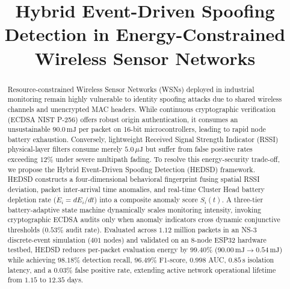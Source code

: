 \documentclass[conference]{IEEEtran}
\begin{document}
\title{Hybrid Event-Driven Spoofing Detection in Energy-Constrained Wireless Sensor Networks}

\author{
}
\maketitle

\begin{abstract}
Resource-constrained Wireless Sensor Networks (WSNs) deployed in industrial monitoring remain highly vulnerable to identity spoofing attacks due to shared wireless channels and unencrypted MAC headers. While continuous cryptographic verification (ECDSA NIST P-256) offers robust origin authentication, it consumes an unsustainable $90.0\,\text{mJ}$ per packet on 16-bit microcontrollers, leading to rapid node battery exhaustion. Conversely, lightweight Received Signal Strength Indicator (RSSI) physical-layer filters consume merely $5.0\,\mu\text{J}$ but suffer from false positive rates exceeding $12\%$ under severe multipath fading. To resolve this energy-security trade-off, we propose the Hybrid Event-Driven Spoofing Detection (HEDSD) framework. HEDSD constructs a four-dimensional behavioral fingerprint fusing spatial RSSI deviation, packet inter-arrival time anomalies, and real-time Cluster Head battery depletion rate ($\dot{E}_i = dE_i/dt$) into a composite anomaly score $S_i(t)$. A three-tier battery-adaptive state machine dynamically scales monitoring intensity, invoking cryptographic ECDSA audits only when anomaly indicators cross dynamic conjunctive thresholds ($0.53\%$ audit rate). Evaluated across $1.12$ million packets in an NS-3 discrete-event simulation ($401$ nodes) and validated on an $8$-node ESP32 hardware testbed, HEDSD reduces per-packet evaluation energy by $99.40\%$ ($90.00\,\text{mJ} \to 0.54\,\text{mJ}$) while achieving $98.18\%$ detection recall, $96.49\%$ F1-score, $0.998$ AUC, $0.85\,\text{s}$ isolation latency, and a $0.03\%$ false positive rate, extending active network operational lifetime from $1.15$ to $12.35$ days.
\end{abstract}
\end{document}

